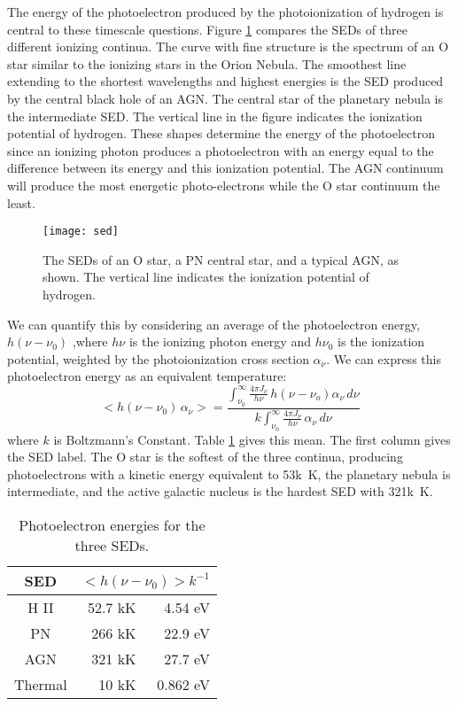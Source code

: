 \documentclass[debug, preprint, twocolumn]{rmaa}
\begin{document}
The energy of the  photoelectron produced by the photoionization of hydrogen
is central to these timescale questions. Figure \ref{fig:sed} compares the
 SEDs of three different ionizing continua.
The curve with fine structure is the spectrum of an O star 
similar to the ionizing stars in the Orion Nebula. 
The smoothest line extending to the shortest wavelengths and highest energies 
is the SED produced by the central black hole of an AGN. 
The central star of the planetary nebula is the intermediate SED. 
The vertical line in the figure indicates the ionization potential of hydrogen. 
These shapes determine the energy of the photoelectron 
since an ionizing photon produces a photoelectron with an energy equal to the 
difference between its energy and this ionization potential. 
The AGN continuum will produce the most energetic photo-electrons while 
the O star continuum the least.

\begin{figure}[t]
\texttt{[image: sed]}
\caption[Three SEDs]{The SEDs of an O star, a PN central star, and a typical AGN,
as shown.  The vertical line indicates the ionization potential of hydrogen.
\label{fig:sed}}
\end{figure}

We can quantify this  by considering an average of the photoelectron energy,
$h ( \nu - \nu_0)$ ,where $h \nu$ is the ionizing photon energy and  $h \nu_0$
is the ionization potential, 
weighted by the photoionization cross section $\alpha_{\nu}$.
We can express this photoelectron energy as 
an equivalent temperature:
\begin{equation}
< h (\nu - \nu_0 )\,  \alpha_\nu >  = \frac{\int_{\nu_0}^{\infty}\frac{4 \pi J_{\nu}}{{h\nu}}\, h(\nu - \nu_o) \alpha_\nu\, d\nu}
{k \int_{\nu_0}^{\infty}\frac{4 \pi J_{\nu}}{{h\nu}}\, \alpha_\nu\, d\nu}
\end{equation}
where $k$ is Boltzmann's Constant.
Table \ref{tab:PhotoElectronEnergy} gives this mean. 
The first column gives the SED label.
The O star is the softest of the three continua, producing photoelectrons with a
kinetic energy equivalent to 53k~K,
the planetary nebula is intermediate,
and the active galactic nucleus is the hardest SED with  321k~K. 

\begin{table}
\centering
\caption{Photoelectron energies for the three SEDs.}
\label{tab:PhotoElectronEnergy}
\null\smallskip
\renewcommand\arraystretch{0.65}
\begin{tabular}{ c r r}
\hline
SED&\multicolumn{2}{c}{$<h(\nu-\nu_0)> k^{-1}$}\\
\hline
H II & 52.7 kK &  4.54 eV\\
PN   & 266  kK & 22.9 eV\\
AGN  & 321  kK & 27.7 eV\\
\hline
Thermal&10 kK & 0.862 eV\\
\hline
\end{tabular}
\end{table}
\end{document}
